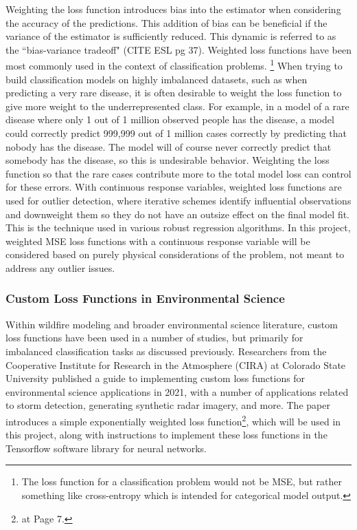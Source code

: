 \documentclass[11pt]{article}%
\begin{document}
Weighting the loss function introduces bias into the estimator when considering the accuracy of the predictions. This addition of bias can be beneficial if the variance of the estimator is sufficiently reduced. This dynamic is referred to as the ``bias-variance tradeoff" (CITE ESL pg 37). Weighted loss functions have been most commonly used in the context of classification problems. \footnote{The loss function for a classification problem would not be MSE, but rather something like cross-entropy which is intended for categorical model output.} When trying to build classification models on highly imbalanced datasets, such as when predicting a very rare disease, it is often desirable to weight the loss function to give more weight to the underrepresented class. For example, in a model of a rare disease where only 1 out of 1 million observed people has the disease, a model could correctly predict 999,999 out of 1 million cases correctly by predicting that nobody has the disease. The model will of course never correctly predict that somebody has the disease, so this is undesirable behavior. Weighting the loss function so that the rare cases contribute more to the total model loss can control for these errors. With continuous response variables, weighted loss functions are used for outlier detection, where iterative schemes identify influential observations and downweight them so they do not have an outsize effect on the final model fit. This is the technique used in various robust regression algorithms.\cite{OLeary-1990-RRC} In this project, weighted MSE loss functions with a continuous response variable will be considered based on purely physical considerations of the problem, not meant to address any outlier issues. 

\subsubsection{Custom Loss Functions in Environmental Science}

Within wildfire modeling and broader environmental science literature, custom loss functions have been used in a number of studies, but primarily for imbalanced classification tasks as discussed previously. Researchers from the Cooperative Institute for Research in the Atmosphere (CIRA) at Colorado State University published a guide to implementing custom loss functions for environmental science applications in 2021, with a number of applications related to storm detection, generating synthetic radar imagery, and more. \cite{Ebert-2021-GCL} The paper introduces a simple exponentially weighted loss function\footnote{\cite{Ebert-2021-GCL} at Page 7.}, which will be used in this project, along with instructions to implement these loss functions in the Tensorflow software library for neural networks.
\end{document}
